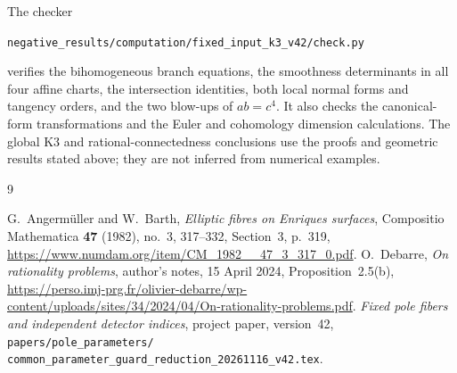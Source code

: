 \documentclass[11pt,a4paper]{article}
\begin{document}
The checker
\begin{center}\small
\texttt{negative\_results/computation/fixed\_input\_k3\_v42/check.py}
\end{center}
verifies the bihomogeneous branch equations, the smoothness determinants
in all four affine charts, the intersection identities, both local
normal forms and tangency orders, and the two blow-ups of $ab=c^4$.
It also checks the canonical-form transformations and the Euler and
cohomology dimension calculations. The global K3 and
rational-connectedness conclusions use the proofs and geometric
results stated above; they are not inferred from numerical examples.

\begin{thebibliography}{9}\raggedright
{}
G.~Angerm\"uller and W.~Barth,
\emph{Elliptic fibres on Enriques surfaces},
Compositio Mathematica \textbf{47} (1982), no.~3, 317--332,
Section~3, p.~319,
\url{https://www.numdam.org/item/CM_1982__47_3_317_0.pdf}.
O.~Debarre, \emph{On rationality problems},
author's notes, 15 April 2024, Proposition~2.5(b),
\url{https://perso.imj-prg.fr/olivier-debarre/wp-content/uploads/sites/34/2024/04/On-rationality-problems.pdf}.
\emph{Fixed pole fibers and independent detector indices},
project paper, version~42,
\texttt{papers/pole\_parameters/}\allowbreak
\texttt{common\_parameter\_guard\_reduction\_20261116\_v42.tex}.
\end{thebibliography}
\end{document}
